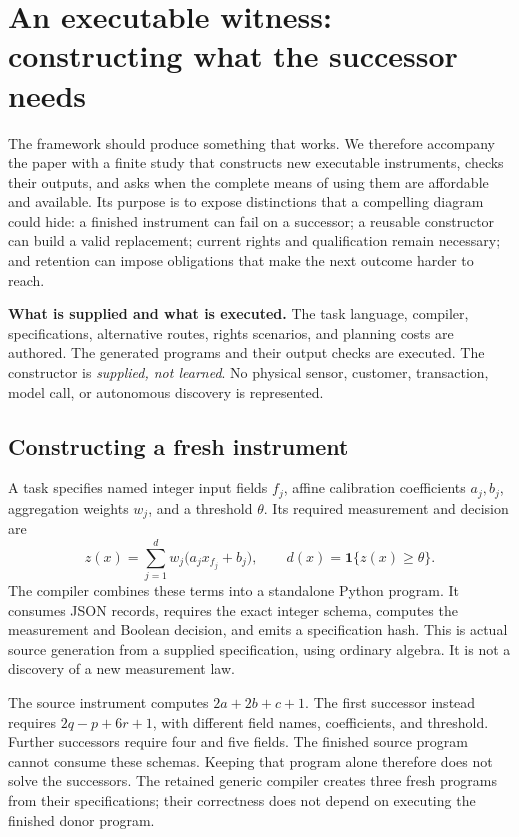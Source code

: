 \section{An executable witness: constructing what the successor needs}\label{sec:study}

The framework should produce something that works. We therefore accompany the
paper with a finite study that constructs new executable instruments, checks their
outputs, and asks when the complete means of using them are affordable and
available. Its purpose is to expose distinctions that a compelling diagram could
hide: a finished instrument can fail on a successor; a reusable constructor can
build a valid replacement; current rights and qualification remain necessary; and
retention can impose obligations that make the next outcome harder to reach.

\begin{statusbox}
\textbf{What is supplied and what is executed.} The task language, compiler,
specifications, alternative routes, rights scenarios, and planning costs are
authored. The generated programs and their output checks are executed. The
constructor is \emph{supplied, not learned}. No physical sensor, customer,
transaction, model call, or autonomous discovery is represented.
\end{statusbox}

\subsection{Constructing a fresh instrument}

A task specifies named integer input fields $f_j$, affine calibration coefficients
$a_j,b_j$, aggregation weights $w_j$, and a threshold $\theta$. Its required
measurement and decision are
\begin{equation}
 z(x)=\sum_{j=1}^{d}w_j\bigl(a_jx_{f_j}+b_j\bigr),
 \qquad d(x)=\mathbf 1\{z(x)\geq\theta\}.
 \label{eq:study-instrument}
\end{equation}
The compiler combines these terms into a standalone Python program. It consumes
JSON records, requires the exact integer schema, computes the measurement and
Boolean decision, and emits a specification hash. This is actual source
generation from a supplied specification, using ordinary algebra. It is not a
discovery of a new measurement law.

The source instrument computes $2a+2b+c+1$. The first successor instead requires
$2q-p+6r+1$, with different field names, coefficients, and threshold. Further
successors require four and five fields. The finished source program cannot
consume these schemas. Keeping that program alone therefore does not solve the
successors. The retained generic compiler creates three fresh programs from their
specifications; their correctness does not depend on executing the finished donor
program.

